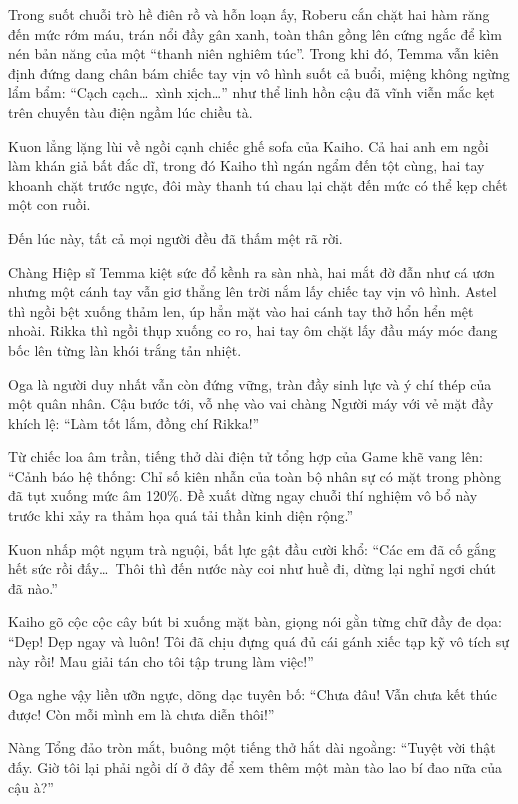 \documentclass[../main.tex]{subfiles}
\begin{document}
Trong suốt chuỗi trò hề điên rồ và hỗn loạn ấy, Roberu cắn chặt hai hàm răng đến mức rớm máu, trán nổi đầy gân xanh, toàn thân gồng lên cứng ngắc để kìm nén bản năng của một ``thanh niên nghiêm túc''. Trong khi đó, Temma vẫn kiên định đứng dang chân bám chiếc tay vịn vô hình suốt cả buổi, miệng không ngừng lẩm bẩm: ``Cạch cạch\dots\ xình xịch\dots'' như thể linh hồn cậu đã vĩnh viễn mắc kẹt trên chuyến tàu điện ngầm lúc chiều tà.

Kuon lẳng lặng lùi về ngồi cạnh chiếc ghế sofa của Kaiho. Cả hai anh em ngồi làm khán giả bất đắc dĩ, trong đó Kaiho thì ngán ngẩm đến tột cùng, hai tay khoanh chặt trước ngực, đôi mày thanh tú chau lại chặt đến mức có thể kẹp chết một con ruồi.

Đến lúc này, tất cả mọi người đều đã thấm mệt rã rời.

Chàng Hiệp sĩ Temma kiệt sức đổ kềnh ra sàn nhà, hai mắt đờ đẫn như cá ươn nhưng một cánh tay vẫn giơ thẳng lên trời nắm lấy chiếc tay vịn vô hình. Astel thì ngồi bệt xuống thảm len, úp hẳn mặt vào hai cánh tay thở hổn hển mệt nhoài. Rikka thì ngồi thụp xuống co ro, hai tay ôm chặt lấy đầu máy móc đang bốc lên từng làn khói trắng tản nhiệt.


Oga là người duy nhất vẫn còn đứng vững, tràn đầy sinh lực và ý chí thép của một quân nhân. Cậu bước tới, vỗ nhẹ vào vai chàng Người máy với vẻ mặt đầy khích lệ: ``Làm tốt lắm, đồng chí Rikka!''

Từ chiếc loa âm trần, tiếng thở dài điện tử tổng hợp của Game khẽ vang lên: ``Cảnh báo hệ thống: Chỉ số kiên nhẫn của toàn bộ nhân sự có mặt trong phòng đã tụt xuống mức âm 120\%. Đề xuất dừng ngay chuỗi thí nghiệm vô bổ này trước khi xảy ra thảm họa quá tải thần kinh diện rộng.''

Kuon nhấp một ngụm trà nguội, bất lực gật đầu cười khổ: ``Các em đã cố gắng hết sức rồi đấy\dots\ Thôi thì đến nước này coi như huề đi, dừng lại nghỉ ngơi chút đã nào.''

Kaiho gõ cộc cộc cây bút bi xuống mặt bàn, giọng nói gằn từng chữ đầy đe dọa: ``Dẹp! Dẹp ngay và luôn! Tôi đã chịu đựng quá đủ cái gánh xiếc tạp kỹ vô tích sự này rồi! Mau giải tán cho tôi tập trung làm việc!''

Oga nghe vậy liền ưỡn ngực, dõng dạc tuyên bố: ``Chưa đâu! Vẫn chưa kết thúc được! Còn mỗi mình em là chưa diễn thôi!''

Nàng Tổng đảo tròn mắt, buông một tiếng thở hắt dài ngoằng: ``Tuyệt vời thật đấy. Giờ tôi lại phải ngồi dí ở đây để xem thêm một màn tào lao bí đao nữa của cậu à?''
\end{document}
